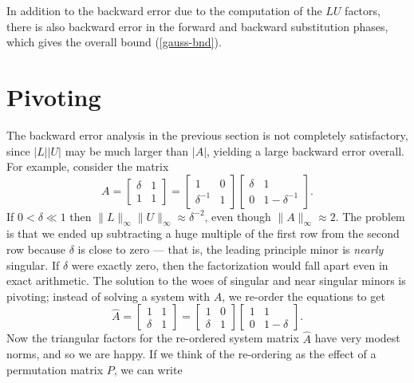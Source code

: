 \documentclass[12pt, leqno]{article}
\begin{document}
In addition to the backward error due to the computation of the $LU$
factors, there is also backward error in the forward and backward
substitution phases, which gives the overall bound (\ref{gauss-bnd}).

\section{Pivoting}


The backward error analysis in the previous section is not completely
satisfactory, since $|L| |U|$ may be much larger than $|A|$, yielding
a large backward error overall.  For example, consider the matrix
\[
  A = \begin{bmatrix} \delta & 1 \\ 1 & 1 \end{bmatrix} =
      \begin{bmatrix} 1 & 0 \\ \delta^{-1} & 1 \end{bmatrix}
      \begin{bmatrix} \delta & 1 \\ 0 & 1-\delta^{-1} \end{bmatrix}.
\]
If $0 < \delta \ll 1$ then $\|L\|_{\infty} \|U\|_{\infty} \approx
\delta^{-2}$, even though $\|A\|_{\infty} \approx 2$.  The problem is
that we ended up subtracting a huge multiple of the first row from the
second row because $\delta$ is close to zero --- that is, the leading
principle minor is {\em nearly} singular.  If $\delta$ were exactly
zero, then the factorization would fall apart even in exact
arithmetic.  The solution to the woes of singular and near singular minors
is pivoting; instead of solving a system with $A$, we re-order the
equations to get
\[
  \hat{A} =
      \begin{bmatrix} 1 & 1 \\ \delta & 1 \end{bmatrix} =
      \begin{bmatrix} 1 & 0 \\ \delta & 1 \end{bmatrix}
      \begin{bmatrix} 1 & 1 \\ 0 & 1-\delta \end{bmatrix}.
\]
Now the triangular factors for the re-ordered system matrix $\hat{A}$
have very modest norms, and so we are happy.  If we think of the re-ordering
as the effect of a permutation matrix $P$, we can write
\end{document}
